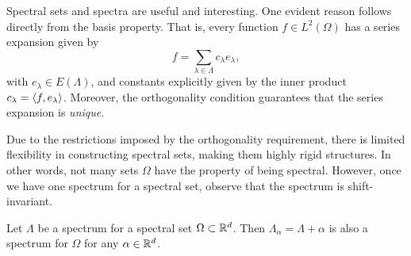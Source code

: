 \documentclass[../thesis.tex]{subfiles}
\begin{document}
Spectral sets and spectra are useful and interesting. One evident reason follows directly from the basis property. That is, every function $f \in L^2(\Omega)$ has a series expansion given by
\begin{equation*}
    f = \sum_{\lambda \in \Lambda} c_{\lambda} e_{\lambda},
\end{equation*}
with $e_\lambda \in E(\Lambda)$, and constants explicitly given by the inner product $c_{\lambda}=\langle f,e_{\lambda}\rangle$. Moreover, the orthogonality condition guarantees that the series expansion is \emph{unique}.

Due to the restrictions imposed by the orthogonality requirement, there is limited flexibility in constructing spectral sets, making them highly rigid structures. In other words, not many sets $\Omega$ have the property of being spectral. However, once we have one spectrum for a spectral set, observe that the spectrum is shift-invariant.
\begin{lemma}\label{lem:spectrum_shift_is_spectrum}
    Let $\Lambda$ be a spectrum for a spectral set $\Omega \subset \mathbb{R}^d$. Then $\Lambda_\alpha = \Lambda + \alpha$ is also a spectrum for $\Omega$ for any  $\alpha \in \mathbb{R}^d$.
\end{lemma}
\end{document}
